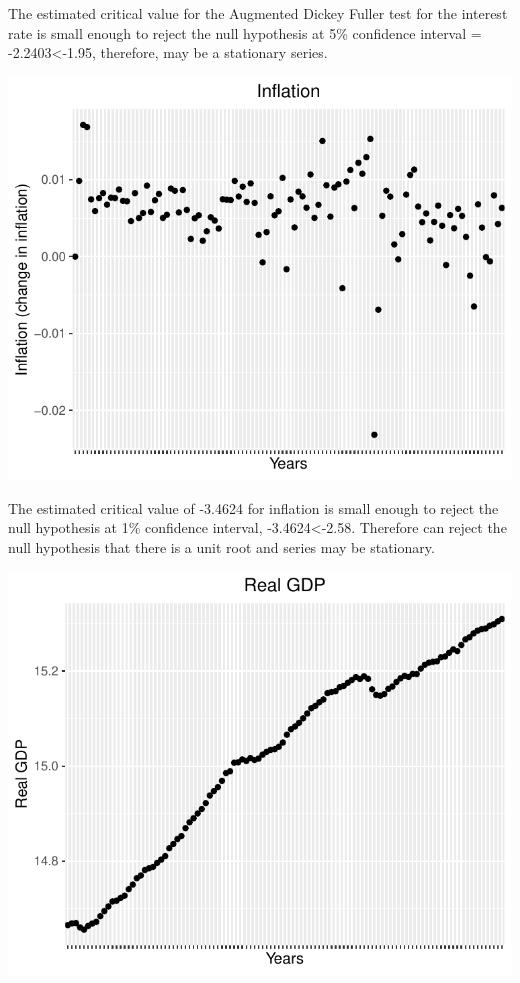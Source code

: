 \documentclass[11pt,preprint, authoryear]{elsarticle}
\numberwithin{equation}{section}
\numberwithin{figure}{section}
\numberwithin{table}{section}
\begin{document}
The estimated critical value for the Augmented Dickey Fuller test for
the interest rate is small enough to reject the null hypothesis at 5\%
confidence interval = -2.2403\textless-1.95, therefore, may be a
stationary series.

\begin{center}\includegraphics{README_files/figure-latex/unnamed-chunk-13-1} \end{center}

The estimated critical value of -3.4624 for inflation is small enough to
reject the null hypothesis at 1\% confidence interval,
-3.4624\textless-2.58. Therefore can reject the null hypothesis that
there is a unit root and series may be stationary.

\begin{center}\includegraphics{README_files/figure-latex/unnamed-chunk-14-1} \end{center}
\end{document}
